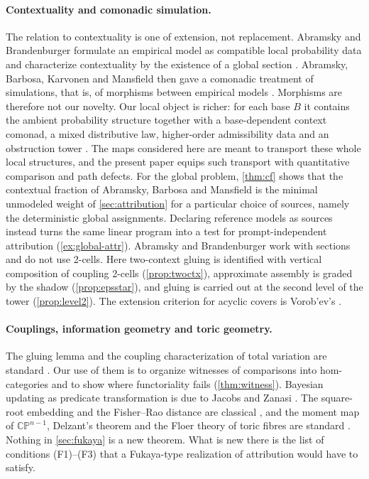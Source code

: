 \documentclass[11pt]{article}
\theoremstyle{definition}
\theoremstyle{remark}
\begin{document}
\paragraph{Contextuality and comonadic simulation.} The relation to contextuality is one of extension,
not replacement. Abramsky and Brandenburger formulate an empirical model as compatible local probability
data and characterize contextuality by the existence of a global section
\cite{AbramskyBrandenburger2011}. Abramsky, Barbosa, Karvonen and Mansfield then gave a comonadic
treatment of simulations, that is, of morphisms between empirical models \cite{Abramsky2019}. Morphisms
are therefore not our novelty. Our local object is richer: for each base $B$ it contains the ambient
probability structure together with a base-dependent context comonad, a mixed distributive law,
higher-order admissibility data and an obstruction tower \cite{Awasthi-Tower}. The maps considered here
are meant to transport these whole local structures, and the present paper equips such transport with
quantitative comparison and path defects. For the global problem, \cref{thm:cf} shows that the
contextual fraction of Abramsky, Barbosa and Mansfield \cite{ABM2017} is the minimal unmodeled weight of
\cref{sec:attribution} for a particular choice of sources, namely the deterministic global assignments.
Declaring reference models as sources instead turns the same linear program into a test for
prompt-independent attribution (\cref{ex:global-attr}). Abramsky and Brandenburger work with sections
and do not use 2-cells. Here two-context gluing is identified with vertical composition of coupling
2-cells (\cref{prop:twoctx}), approximate assembly is graded by the shadow (\cref{prop:epsstar}), and
gluing is carried out at the second level of the tower (\cref{prop:level2}). The extension criterion for
acyclic covers is Vorob'ev's \cite{Vorobev1962}.

\paragraph{Couplings, information geometry and toric geometry.} The gluing lemma and the coupling
characterization of total variation are standard \cite{Villani2009,Lindvall1992}. Our use of them is
to organize witnesses of comparisons into hom-categories and to show where functoriality fails
(\cref{thm:witness}). Bayesian updating as predicate transformation is due to Jacobs and Zanasi
\cite{JacobsZanasi2016}. The square-root embedding and the Fisher--Rao distance are classical
\cite{Wootters1981,AmariNagaoka2000}, and the moment map of $\mathbb{CP}^{n-1}$, Delzant's theorem and
the Floer theory of toric fibres are standard \cite{Delzant1988,LermanTolman1997,Cho2004,ChoOh2006,FOOO2010}.
Nothing in \cref{sec:fukaya} is a new theorem. What is new there is the list of conditions
(F1)--(F3) that a Fukaya-type realization of attribution would have to satisfy.
\end{document}
